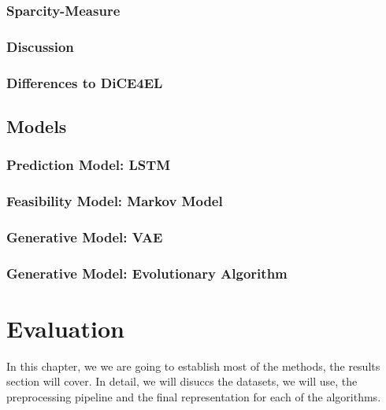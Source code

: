 \documentclass[12pt,a4paper]{report}
\begin{document}
\subsection{Sparcity-Measure}


\subsection{Discussion}


\subsection{Differences to DiCE4EL}

 

\section{Models}
\label{sec:models}

\subsection{Prediction Model: LSTM}
\label{sec:model_prediction}


\subsection{Feasibility Model: Markov Model}
\label{sec:model_feasibility}


\subsection{Generative Model: VAE}
\label{sec:model_vae}


\subsection{Generative Model: Evolutionary Algorithm}
\label{sec:model_evolutionary}


\chapter{Evaluation}
\label{sec:datasets}
In this chapter, we we are going to establish most of the methods, the results section will cover. In detail, we will disuccs the datasets, we will use, the preprocessing pipeline and the final representation for each of the algorithms.

\end{document}
